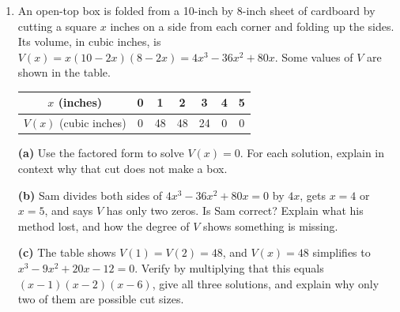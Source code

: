 \documentclass[10pt]{article}
\begin{document}
\begin{enumerate}[leftmargin=1.9em, itemsep=2pt, topsep=2pt, start=6]

\item An open-top box is folded from a 10-inch by 8-inch sheet of cardboard by cutting a square
      $x$ inches on a side from each corner and folding up the sides. Its volume, in cubic
      inches, is $V(x) = x(10 - 2x)(8 - 2x) = 4x^3 - 36x^2 + 80x$. Some values of $V$ are
      shown in the table.

      \begin{center}
      \renewcommand{\arraystretch}{1.2}
      \begin{tabular}{|c|c|c|c|c|c|c|}
      \hline
      \rowcolor{lilac} $x$ (inches) & 0 & 1 & 2 & 3 & 4 & 5 \\ \hline
      $V(x)$ (cubic inches) & 0 & 48 & 48 & 24 & 0 & 0 \\ \hline
      \end{tabular}
      \end{center}

      \textbf{(a)} Use the factored form to solve $V(x) = 0$. For each solution, explain in
      context why that cut does not make a box.
      \rubricbox[2pt]{\gradedblank[id=ap6a, type=rubric, points=2,
        display={$x = 0$, $4$, $5$. A 0-inch cut leaves the sheet flat; a 4-inch cut uses up the 8-inch side ($8 - 2(4) = 0$); a 5-inch cut uses up the 10-inch side. A real box needs $0 < x < 4$.}]{\linewidth}{2in}}

      \textbf{(b)} Sam divides both sides of $4x^3 - 36x^2 + 80x = 0$ by $4x$, gets $x = 4$ or
      $x = 5$, and says $V$ has only two zeros. Is Sam correct? Explain what his method lost, and
      how the degree of $V$ shows something is missing.
      \rubricbox[2pt]{\gradedblank[id=ap6b, type=rubric, points=2,
        display={No. Dividing by $4x$ assumes $x \ne 0$, so it lost the zero $x = 0$. $V$ has degree 3, so it has three zeros: factor instead, $4x(x^2 - 9x + 20) = 4x(x - 4)(x - 5)$, giving $0$, $4$, $5$.}]{\linewidth}{2in}}

      \textbf{(c)} The table shows $V(1) = V(2) = 48$, and $V(x) = 48$ simplifies to
      $x^3 - 9x^2 + 20x - 12 = 0$. Verify by multiplying that this equals $(x - 1)(x - 2)(x - 6)$,
      give all three solutions, and explain why only two of them are possible cut sizes.
      \rubricbox[2pt]{\gradedblank[id=ap6c, type=rubric, points=2,
        display={$(x - 1)(x - 2) = x^2 - 3x + 2$; times $(x - 6)$: $x^3 - 6x^2 - 3x^2 + 18x + 2x - 12 = x^3 - 9x^2 + 20x - 12$. Solutions $x = 1, 2, 6$. A 6-inch cut is impossible: $8 - 2(6) < 0$, and a cut must satisfy $0 < x < 4$. So only 1 inch and 2 inches give a 48-cubic-inch box.}]{\linewidth}{2in}}

\end{enumerate}
\end{document}
